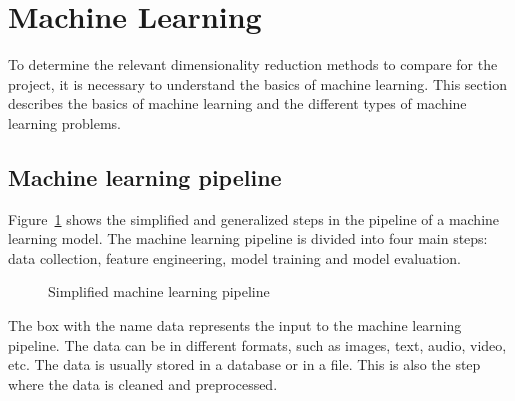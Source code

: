 \section{Machine Learning}\label{sec:machine-learning}
To determine the relevant dimensionality reduction methods to compare for the project, it is necessary to understand the basics of machine learning. This section describes the basics of machine learning and the different types of machine learning problems.


\subsection{Machine learning pipeline}\label{subsec:machine-learning-pipeline}
Figure~\ref{fig:basic-machine-learning-pipeline} shows the simplified and generalized steps in the pipeline of a machine learning model. The machine learning pipeline is divided into four main steps: data collection, feature engineering, model training and model evaluation.


\begin{figure}[htb!]
    \centering
    \caption{Simplified machine learning pipeline}
    \label{fig:basic-machine-learning-pipeline}
\end{figure}


The box with the name data represents the input to the machine learning pipeline. The data can be in different formats, such as images, text, audio, video, etc. The data is usually stored in a database or in a file. This is also the step where the data is cleaned and preprocessed.

